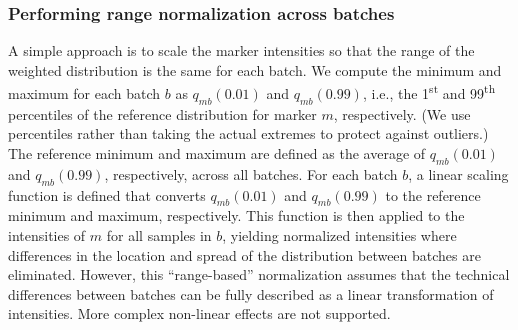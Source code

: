 \documentclass{article}
\begin{document}
\subsubsection{Performing range normalization across batches}
A simple approach is to scale the marker intensities so that the range of the weighted distribution is the same for each batch.
We compute the minimum and maximum for each batch $b$ as $q_{mb}(0.01)$ and $q_{mb}(0.99)$, i.e., the 1\textsuperscript{st} and 99\textsuperscript{th} percentiles of the reference distribution for marker $m$, respectively.
(We use percentiles rather than taking the actual extremes to protect against outliers.)
The reference minimum and maximum are defined as the average of $q_{mb}(0.01)$ and $q_{mb}(0.99)$, respectively, across all batches.
For each batch $b$, a linear scaling function is defined that converts $q_{mb}(0.01)$ and $q_{mb}(0.99)$ to the reference minimum and maximum, respectively.
This function is then applied to the intensities of $m$ for all samples in $b$, yielding normalized intensities where differences in the location and spread of the distribution between batches are eliminated.
However, this ``range-based'' normalization assumes that the technical differences between batches can be fully described as a linear transformation of intensities.
More complex non-linear effects are not supported.
\end{document}
